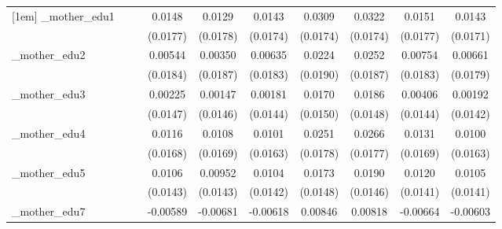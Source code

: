 \begin{table}[htbp]
\begin{tabular}{l*{9}{c}}
[1em]
\_mother\_edu1&                     &                     &      0.0148         &      0.0129         &      0.0143         &      0.0309\sym{*}  &      0.0322\sym{*}  &      0.0151         &      0.0143         \\
            &                     &                     &    (0.0177)         &    (0.0178)         &    (0.0174)         &    (0.0174)         &    (0.0174)         &    (0.0177)         &    (0.0171)         \\
[1em]
\_mother\_edu2&                     &                     &     0.00544         &     0.00350         &     0.00635         &      0.0224         &      0.0252         &     0.00754         &     0.00661         \\
            &                     &                     &    (0.0184)         &    (0.0187)         &    (0.0183)         &    (0.0190)         &    (0.0187)         &    (0.0183)         &    (0.0179)         \\
[1em]
\_mother\_edu3&                     &                     &     0.00225         &     0.00147         &     0.00181         &      0.0170         &      0.0186         &     0.00406         &     0.00192         \\
            &                     &                     &    (0.0147)         &    (0.0146)         &    (0.0144)         &    (0.0150)         &    (0.0148)         &    (0.0144)         &    (0.0142)         \\
[1em]
\_mother\_edu4&                     &                     &      0.0116         &      0.0108         &      0.0101         &      0.0251         &      0.0266         &      0.0131         &      0.0100         \\
            &                     &                     &    (0.0168)         &    (0.0169)         &    (0.0163)         &    (0.0178)         &    (0.0177)         &    (0.0169)         &    (0.0163)         \\
[1em]
\_mother\_edu5&                     &                     &      0.0106         &     0.00952         &      0.0104         &      0.0173         &      0.0190         &      0.0120         &      0.0105         \\
            &                     &                     &    (0.0143)         &    (0.0143)         &    (0.0142)         &    (0.0148)         &    (0.0146)         &    (0.0141)         &    (0.0141)         \\
[1em]
\_mother\_edu7&                     &                     &    -0.00589         &    -0.00681         &    -0.00618         &     0.00846         &     0.00818         &    -0.00664         &    -0.00603         \\

\end{tabular}
\end{table}

